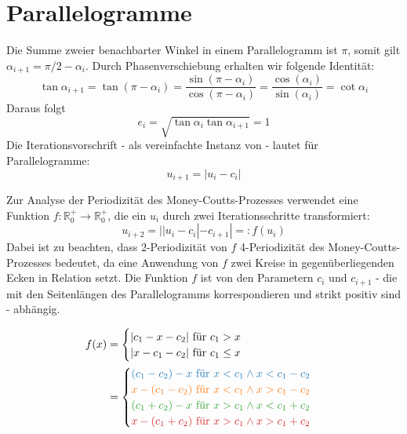 \chapter{Parallelogramme}

Die Summe zweier benachbarter Winkel in einem Parallelogramm ist $\pi$,
somit gilt $\alpha_{i+1} = \pi/2 - \alpha_i$.
Durch Phasenverschiebung erhalten wir folgende Identität:
\begin{equation*}
    \tan\alpha_{i+1}  = \tan(\pi - \alpha_i)
    = \frac{\sin(\pi - \alpha_i)}{\cos(\pi - \alpha_i)}
    = \frac{\cos(\alpha_i)}{\sin(\alpha_i)}
    = \cot\alpha_i
\end{equation*}
Daraus folgt
\begin{equation*}
    e_i = \sqrt{\tan\alpha_i \tan \alpha_{i+1}} = 1
\end{equation*}
Die Iterationsvorschrift - als vereinfachte Instanz von  - lautet für Parallelogramme:
\begin{equation*}
    u_{i+1}=|u_i - c_i|
\end{equation*}

Zur Analyse der Periodizität des Money-Coutts-Prozesses verwendet \citet{Troub2000}
eine Funktion $f:\mathbb{R}_0^+ \to \mathbb{R}_0^+$, die ein $u_i$ durch zwei Iterationsschritte transformiert:
\begin{equation*}
    u_{i+2}=||u_i-c_i|-c_{i+1}| =: f(u_i)
\end{equation*}
Dabei ist zu beachten, dass 2-Periodizität von $f$ 4-Periodizität des Money-Coutts-Prozesses bedeutet,
da eine Anwendung von $f$ zwei Kreise in gegenüberliegenden Ecken in Relation setzt.
Die Funktion $f$ ist von den Parametern $c_i$ und $c_{i+1}$ - die mit den Seitenlängen des Parallelogramms korrespondieren und strikt positiv sind - abhängig.

\begin{align}
    f(x) & = \begin{cases}
                 |c_1-x-c_2| \text{ für } c_1 > x \\
                 |x-c_1-c_2| \text{ für } c_1 \leq x
             \end{cases}             \\
         & =\begin{cases}
                \color{plt_blue}
                (c_1-c_2)-x \text{ für } x<c_1 \wedge x<c_1-c_2 \\
                \color{plt_orange}
                x-(c_1-c_2) \text{ für } x<c_1 \wedge x>c_1-c_2 \\
                \color{plt_green}
                (c_1+c_2)-x \text{ für } x>c_1 \wedge x<c_1+c_2 \\
                \color{plt_red}
                x-(c_1+c_2) \text{ für } x>c_1 \wedge x>c_1+c_2 \\
            \end{cases}
    \label{parallelogram:cases}
\end{align}

